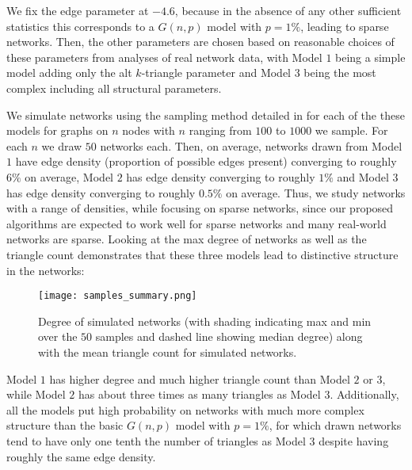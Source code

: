  	 We fix the edge parameter at $-4.6$, because in the absence of any other sufficient statistics this corresponds to a $G(n,p)$ model with $p = 1\%$, leading to sparse networks. Then, the other parameters are chosen based on reasonable choices of these parameters from analyses of real network data, with Model $1$ being a simple model adding only the alt $k$-triangle parameter and Model $3$ being the most complex including all structural parameters. 
 	 
 	 We simulate networks using the sampling method detailed in  for each of the these models for graphs on $n$ nodes with $n$ ranging from $100$ to $1000$ we sample. For each $n$ we draw $50$ networks each. Then, on average, networks drawn from Model $1$  have edge density (proportion of possible edges present) converging to roughly $6\%$ on average, Model $2$ has edge density converging to roughly $1\%$ and
 	 Model $3$ has edge density converging to roughly $0.5\%$ on average. Thus, we study networks with a range of densities, while focusing on sparse networks, since our proposed algorithms are expected to work well for sparse networks and many real-world networks are sparse. Looking at the max degree of networks as well as the triangle count demonstrates that these three models lead to distinctive structure in the networks:
 	
 	\begin{figure}[!h]
 		\centering
 		\texttt{[image: samples\_summary.png]}
 		\caption{Degree of simulated networks (with shading indicating max and min over the $50$ samples and dashed line showing median degree) along with the mean triangle count for simulated networks.}
 	\end{figure}
 
 	 Model $1$ has higher degree and much higher triangle count than Model $2$ or $3$, while Model $2$ has about three times as many triangles as Model $3$. Additionally, all the models put high probability on networks with much more complex structure than the basic $G(n,p)$ model with $p = 1\%$, for which  drawn networks tend to have only one tenth the number of triangles as Model $3$ despite having roughly the same edge density.  
 	
